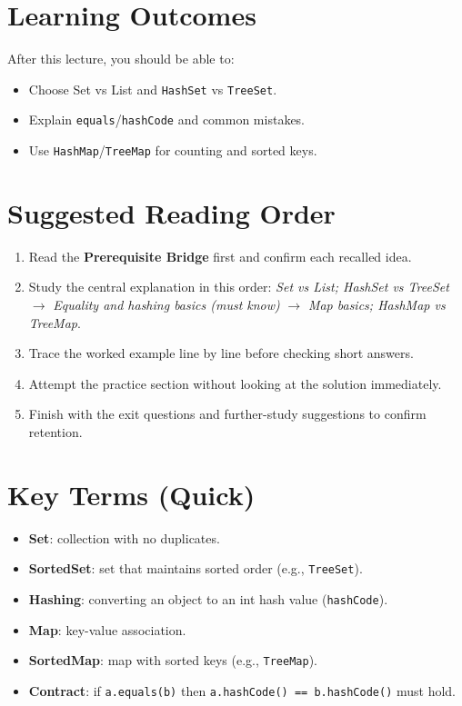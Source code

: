\documentclass[11pt]{article}
\begin{document}
\section{Learning Outcomes}
After this lecture, you should be able to:
\begin{itemize}
  \item Choose Set vs List and \texttt{HashSet} vs \texttt{TreeSet}.
  \item Explain \texttt{equals}/\texttt{hashCode} and common mistakes.
  \item Use \texttt{HashMap}/\texttt{TreeMap} for counting and sorted keys.
\end{itemize}

\section{Suggested Reading Order}
\begin{enumerate}
  \item Read the \textbf{Prerequisite Bridge} first and confirm each recalled idea.
  \item Study the central explanation in this order: \textit{Set vs List; HashSet vs TreeSet} $\rightarrow$ \textit{Equality and hashing basics (must know)} $\rightarrow$ \textit{Map basics; HashMap vs TreeMap}.
  \item Trace the worked example line by line before checking short answers.
  \item Attempt the practice section without looking at the solution immediately.
  \item Finish with the exit questions and further-study suggestions to confirm retention.
\end{enumerate}
\notesources{\OOPSUnitVSources}

\section{Key Terms (Quick)}
\begin{itemize}
  \item \textbf{Set}: collection with no duplicates.
  \item \textbf{SortedSet}: set that maintains sorted order (e.g., \texttt{TreeSet}).
  \item \textbf{Hashing}: converting an object to an int hash value (\texttt{hashCode}).
  \item \textbf{Map}: key-value association.
  \item \textbf{SortedMap}: map with sorted keys (e.g., \texttt{TreeMap}).
  \item \textbf{Contract}: if \texttt{a.equals(b)} then \texttt{a.hashCode() == b.hashCode()} must hold.
\end{itemize}
\end{document}
